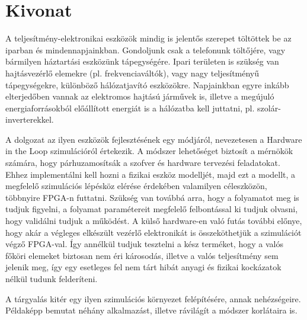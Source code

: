 \setcounter{page}{1}

\selecthungarian

\chapter*{Kivonat}

A teljesítmény-elektronikai eszközök mindig is jelentős szerepet töltöttek be az iparban és mindennapjainkban. Gondoljunk csak a telefonunk töltőjére, vagy bármilyen háztartási eszközünk tápegységére. Ipari területen is szükség van hajtásvezérlő elemekre (pl. frekvenciaváltók), vagy nagy teljesítményű tápegységekre, különböző hálózatjavító eszközökre. Napjainkban egyre inkább elterjedőben vannak az elektromos hajtású járművek is, illetve a megújuló energiaforrásokból előállított energiát is a hálózatba kell juttatni, pl. szolár-inverterekkel.

A dolgozat az ilyen eszközök fejlesztésének egy módjáról, nevezetesen a Hardware in the Loop szimulációról értekezik. A módszer lehetőséget biztosít a mérnökök számára, hogy párhuzamosítsák a szofver és hardware tervezési feladatokat. Ehhez implementálni kell hozni a fizikai eszköz modelljét, majd ezt a modellt, a megfelelő szimulációs lépésköz elérése érdekében valamilyen céleszközön, többnyire FPGA-n futtatni. Szükség van továbbá arra, hogy a folyamatot meg is tudjuk figyelni, a folyamat paramétereit megfelelő felbontással ki tudjuk olvasni, hogy validálni tudjuk a működést. A külső hardware-en való futás további előnye, hogy akár a végleges elkészült vezérlő elektronikát is összeköthetjük a szimulációt végző FPGA-val. Így annélkül tudjuk tesztelni a kész terméket, hogy a valós főköri elemeket biztosan nem éri károsodás, illetve a valós teljesítmény sem jelenik meg, így egy esetleges fel nem tárt hibát anyagi és fizikai kockázatok nélkül tudunk felderíteni.

A tárgyalás kitér egy ilyen szimulációs környezet felépítésére, annak nehézségeire. Példaképp bemutat néhány alkalmazást, illetve rávilágít a módszer korlátaira is.


\vfill
\selectenglish


